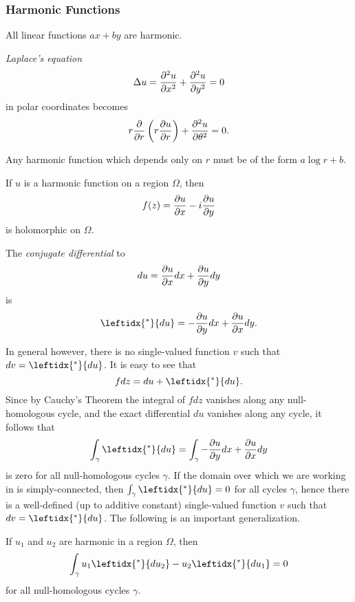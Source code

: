 \subsubsection{Harmonic Functions}

\begin{lemma}
  All linear functions $a x + b y$ are harmonic.
\end{lemma}

\emph{Laplace's equation}
\[
\Delta u = \frac{\partial^2 u}{\partial x^2} + \frac{\partial^2 u}{\partial y^2} = 0
\]
in polar coordinates becomes
\[
r \frac{\partial}{\partial r} \left( r \frac{\partial u}{\partial r} \right) + \frac{\partial^2 u}{\partial \theta^2} = 0.
\]

\begin{corollary}
  Any harmonic function which depends only on $r$ must be of the form $a \log r + b$.
\end{corollary}

\begin{lemma}
  If $u$ is a harmonic function on a region $\Omega$, then
  \[
  f(z) = \frac{\partial u}{\partial x} - i \frac{\partial u}{\partial y}
  \]
  is holomorphic on $\Omega$.
\end{lemma}

\begin{definition}
  The \emph{conjugate differential} to
  \[
  d u = \frac{\partial u}{\partial x} d x + \frac{\partial u}{\partial y} d y
  \]
  is
  \[
  \leftidx{^\ast}{d u} = -\frac{\d u}{\d y} d x + \frac{\d u}{\d x} d y.
  \]
\end{definition}

In general however, there is no single-valued function $v$ such that $d v = \leftidx{^\ast}{d u}$. It is easy to see that
\[
f d z = d u + \leftidx{^\ast}{d u}.
\]
Since by Cauchy's Theorem the integral of $f d z$ vanishes along any null-homologous cycle, and the exact differential $d u$ vanishes along any cycle, it follows that
\[
\int_\gamma \leftidx{^\ast}{d u} = \int_\gamma - \frac{\d u}{\d y} d x + \frac{\d u}{\d x} d y
\]
is zero for all null-homologous cycles $\gamma$. If the domain over which we are working in is simply-connected, then $\int_\gamma \leftidx{^\ast}{d u} = 0$ for all cycles $\gamma$, hence there is a well-defined (up to additive constant) single-valued function $v$ such that $d v = \leftidx{^\ast}{d u}$. The following is an important generalization.

\begin{theorem}
  If $u_1$ and $u_2$ are harmonic in a region $\Omega$, then
  \[
  \int_\gamma u_1 \leftidx{^\ast}{d u_2} - u_2 \leftidx{^\ast}{d u_1} = 0
  \]
  for all null-homologous cycles $\gamma$.  
\end{theorem}

